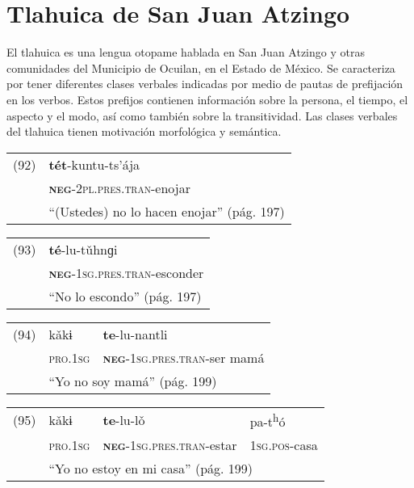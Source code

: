 \section*{Tlahuica de San Juan Atzingo}

\noindent El tlahuica es una lengua otopame hablada en San Juan Atzingo y otras comunidades del Municipio de Ocuilan, en el Estado de México. Se caracteriza por tener diferentes clases verbales indicadas por medio de pautas de prefijación en los verbos. Estos prefijos contienen información sobre la persona, el tiempo, el aspecto y el modo, así como también sobre la transitividad. Las clases verbales del tlahuica tienen motivación morfológica y semántica. \vspace{0.5cm}

{\setmainfont{Charis SIL} 

\begin{tabular}{ll}
(92) & \textbf{tét}-kuntu-ts’ája \\
& \textsc{\textbf{neg}-2pl.pres.tran}-enojar\\
& ``(Ustedes) no lo hacen enojar'' (pág. 197)
\end{tabular} \vspace{0.5cm}

\begin{tabular}{ll}
(93) & \textbf{té}-lu-tǔhnɡi \\
& \textsc{\textbf{neg}-1sg.pres.tran}-esconder \\
& ``No lo escondo'' (pág. 197)
\end{tabular} \vspace{0.5cm}

\begin{tabular}{lll}
(94) & kǎkɨ & \textbf{te}-lu-nantli \\
& \textsc{pro.1sg} & \textsc{\textbf{neg}-1sg.pres.tran}-ser mamá\\
& \multicolumn{2}{l}{``Yo no soy mamá'' (pág. 199)}
\end{tabular} \vspace{0.5cm}

\begin{tabular}{llll}
(95) & kǎkɨ & \textbf{te}-lu-lǒ & pa-t\textsuperscript{h}ó \\
& \textsc{pro.1sg} & \textsc{\textbf{neg}-1sg.pres.tran}-estar & \textsc{1sg.pos}-casa \\
& \multicolumn{3}{l}{``Yo no estoy en mi casa'' (pág. 199)}
\end{tabular} \vspace{0.5cm}

}
